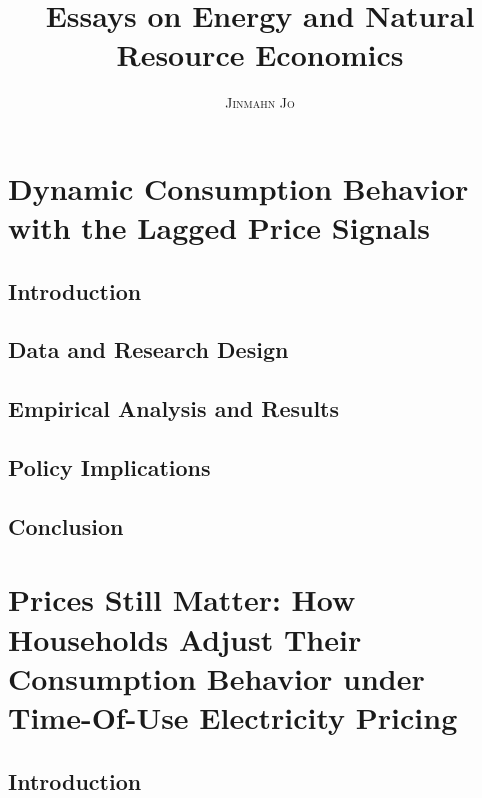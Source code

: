 \documentclass[11pt, draftcls]{ucdavisthesis}
\title {
    Essays on Energy and Natural Resource Economics
}
\author {
    \textsc{Jinmahn Jo}
}
\begin{document}
\makeintropages


\chapter{Dynamic Consumption Behavior with the Lagged Price Signals}
\label{Chapter:Chapter-1}

\section{Introduction}
\label{C1-Section:Introduction}



\section{Data and Research Design}
\label{C1-Section:Data-and-Research-Design}



\section{Empirical Analysis and Results}
\label{C1-Section:Empirical-Analysis-and-Results}



\section{Policy Implications}
\label{C1-Section:Policy-Implications}



\section{Conclusion}
\label{C1-Section:Conclusion}



\chapter{Prices Still Matter: How Households Adjust Their Consumption Behavior under Time-Of-Use Electricity Pricing}
\label{Chapter:Chapter-2}

\section{Introduction}
\label{C2-Section:Introduction}

\end{document}
